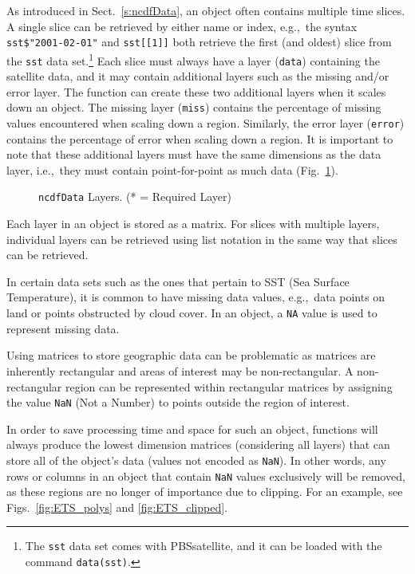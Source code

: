 \documentclass[11pt]{report}
\begin{document}
As introduced in Sect.~\ref{s:ncdfData}, an  object often contains multiple time slices.
A single slice can be retrieved by either name or index, e.g.,~the syntax \lstinline{sst$"2001-02-01"} and \lstinline{sst[[1]]} both retrieve the first (and oldest) slice from the \lstinline+sst+ data set.\footnote{
  The \lstinline+sst+ data set comes with PBSsatellite, and it can be loaded with the command \lstinline{data(sst)}.
}
Each slice must always have a layer (\texttt{data}) containing the satellite data, and it may contain additional layers such as the missing and/or error layer.
The  function can create these two additional layers when it scales down an  object.
The missing layer (\texttt{miss}) contains the percentage of missing values encountered when scaling down a region.
Similarly, the error layer (\texttt{error}) contains the percentage of error when scaling down a region.
It is important to note that these additional layers must have the same dimensions as the data layer, i.e.,~they must contain point-for-point as much data (Fig.~\ref{fig:ncdfDataLayers}).

\begin{figure}
  \centering
  \caption{\texttt{ncdfData} Layers. (* = Required Layer)}
  \label{fig:ncdfDataLayers}
\end{figure}

Each layer in an  object is stored as a matrix.
For slices with multiple layers, individual layers can be retrieved using list notation in the same way that slices can be retrieved.

\label{par:missingData}
In certain data sets such as the ones that pertain to SST (Sea Surface Temperature), it is common to have missing data values, e.g.,~data points on land or points obstructed by cloud cover.
In an  object, a \lstinline{NA} value is used to represent missing data.

Using matrices to store geographic data can be problematic as matrices are inherently rectangular and areas of interest may be non-rectangular.
A non-rectangular region can be represented within rectangular matrices by assigning the value \lstinline{NaN} (Not a Number) to points outside the region of interest.

In order to save processing time and space for such an  object, functions will always produce the lowest dimension matrices (considering all layers) that can store all of the object's data (values not encoded as \lstinline{NaN}).
In other words, any rows or columns in an  object that contain \lstinline{NaN} values exclusively will be removed, as these regions are no longer of importance due to clipping.
For an example, see Figs.~\ref{fig:ETS_polys} and \ref{fig:ETS_clipped}.
\end{document}
